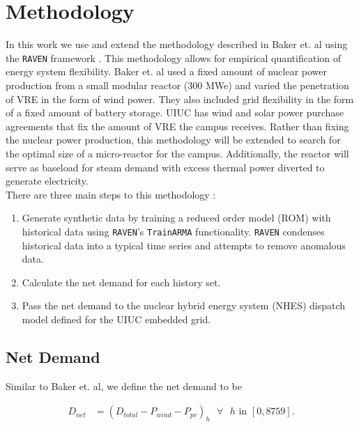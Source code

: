 \section{Methodology}

In this work we use and extend the methodology described in Baker et. al using
the \texttt{RAVEN}
framework \cite{baker_optimal_2018,alfonsi_raven_2016}.
This methodology allows for empirical quantification of energy system
flexibility.
Baker et. al used a fixed amount of nuclear power production from a small
modular reactor (300
MWe) and varied the penetration of VRE in the form of wind power.
They also included grid flexibility in the form of a fixed amount of battery
storage. UIUC has
wind and solar power purchase agreements that fix the amount of VRE the campus
receives.
Rather than fixing the nuclear power production, this methodology will be
extended to search for
the optimal size of a micro-reactor for the campus.
Additionally, the reactor will serve as baseload for steam demand with excess
thermal power
diverted to generate electricity.\\
There are three main steps to this methodology \cite{baker_optimal_2018}:

\begin{enumerate}
	\item Generate synthetic data by training a reduced order model (ROM) with
	historical data using
	\texttt{RAVEN}'s \texttt{TrainARMA} functionality. \texttt{RAVEN} condenses
	historical data into
	a typical time series and attempts to remove anomalous data.
	\item Calculate the net demand for each history set.
	\item Pass the net demand to the nuclear hybrid energy system (NHES) dispatch
	model defined for
	the UIUC embedded grid.
\end{enumerate}

\subsection{Net Demand}
Similar to Baker et. al, we define the net demand to be


\begin{equation}
	\label{eqn:net-demand}
	\begin{split}
		D_{net} & = (D_{total} - P_{wind} - P_{pv})_h \text{ $\forall$ $h$ in }
		[0,8759].
	\end{split}
\end{equation}

